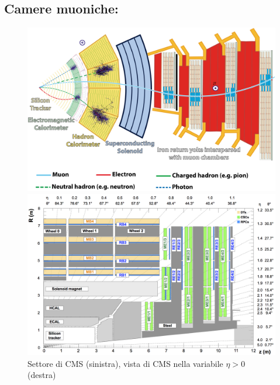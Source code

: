 \subsection{Camere muoniche:}

\begin{figure}[h]
  \centering
  \begin{minipage}[b]{0.48\textwidth}
      \centering
      \includegraphics[width=\textwidth]{../ImmaginiTesi/CMS slice.png} 
  \end{minipage}
  \hfill 
  \begin{minipage}[b]{0.48\textwidth}
      \centering
      \includegraphics[width=\textwidth]{../ImmaginiTesi/CMSEtaView.png} 
  \end{minipage}
  \caption{Settore di CMS (sinistra), vista di CMS  nella variabile $\eta > 0$ (destra)}
  \label{fig:SectorEtaView}
\end{figure}


